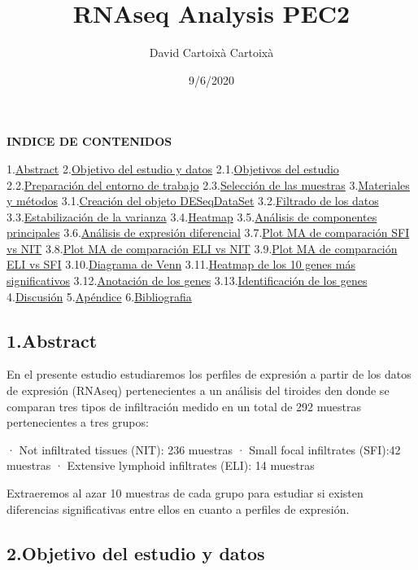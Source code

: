 \documentclass[
]{article}
\title{RNAseq Analysis PEC2}
\author{David Cartoixà Cartoixà}
\date{9/6/2020}
\begin{document}
\maketitle

\textbf{INDICE DE CONTENIDOS}

1.\protect\hyperlink{id1}{Abstract} 2.\protect\hyperlink{id2}{Objetivo
del estudio y datos} 2.1.\protect\hyperlink{id3}{Objetivos del estudio}
2.2.\protect\hyperlink{id4}{Preparación del entorno de trabajo}
2.3.\protect\hyperlink{id5}{Selección de las muestras}
3.\protect\hyperlink{id6}{Materiales y métodos}
3.1.\protect\hyperlink{id7}{Creación del objeto DESeqDataSet}
3.2.\protect\hyperlink{id8}{Filtrado de los datos}
3.3.\protect\hyperlink{id9}{Estabilización de la varianza}
3.4.\protect\hyperlink{id10}{Heatmap}
3.5.\protect\hyperlink{id11}{Análisis de componentes principales}
3.6.\protect\hyperlink{id12}{Análisis de expresión diferencial}
3.7.\protect\hyperlink{id13}{Plot MA de comparación SFI vs NIT}
3.8.\protect\hyperlink{id14}{Plot MA de comparación ELI vs NIT}
3.9.\protect\hyperlink{id15}{Plot MA de comparación ELI vs SFI}
3.10.\protect\hyperlink{id16}{Diagrama de Venn}
3.11.\protect\hyperlink{id17}{Heatmap de los 10 genes más
significativos} 3.12.\protect\hyperlink{id18}{Anotación de los genes}
3.13.\protect\hyperlink{id19}{Identificación de los genes}
4.\protect\hyperlink{id20}{Discusión}
5.\protect\hyperlink{id21}{Apéndice}
6.\protect\hyperlink{id22}{Bibliografia}

\hypertarget{abstract}{%
\subsection{1.Abstract}\label{abstract}}

En el presente estudio estudiaremos los perfiles de expresión a partir
de los datos de expresión (RNAseq) pertenecientes a un análisis del
tiroides den donde se comparan tres tipos de infiltración medido en un
total de 292 muestras pertenecientes a tres grupos:

· Not infiltrated tissues (NIT): 236 muestras · Small focal infiltrates
(SFI):42 muestras · Extensive lymphoid infiltrates (ELI): 14 muestras

Extraeremos al azar 10 muestras de cada grupo para estudiar si existen
diferencias significativas entre ellos en cuanto a perfiles de
expresión.

\hypertarget{objetivo-del-estudio-y-datos}{%
\subsection{2.Objetivo del estudio y
datos}\label{objetivo-del-estudio-y-datos}}
\end{document}
